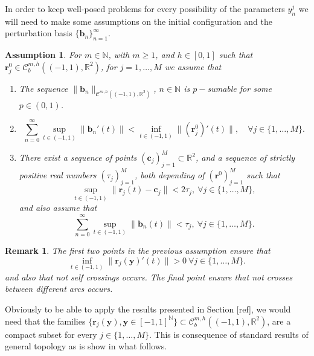 \documentclass{article}
\newtheorem{remark}[theorem]{Remark}
\newtheorem{assumption}[theorem]{Assumption}
\newcommand{\todo}[1]{{\color{red}[#1]}}
\newcommand{\IN}{{\mathbb N}}
\newcommand{\IR}{{\mathbb R}}
\newcommand{\cmspaceh}[4]{\mathcal{C}^{#1,#2} \left( #3, #4 \right)}
\newcommand{\rgeoh}[2]{\mathcal{C}_b^{#1,#2}\left( (-1,1), \IR^2 \right)}
\newcommand{\bc}{\bm{c}}
\newcommand{\br}{\bm{r}}
\newcommand{\by}{\bm{y}}
\newcommand{\bb}{\bm{b}}
\begin{document}
In order to keep well-posed problems for every possibility of the parameters $y^j_n$ we will need to make some assumptions on the initial configuration and the perturbation basis $\{\bb_n\}_{n=1}^\infty$. 

\begin{assumption}
\label{assump:geoparam}
For $m \in \IN$, with $m\geq 1$, and $h \in [0,1]$ such that $\br^0_j \in \rgeoh{m}{h}$, for $j =1,\hdots,M$ we assume that
\begin{enumerate}
\item 
The sequence $\|\bb_n\|_{\cmspaceh{m}{h}{(-1,1)}{\IR^2}}$, $n\in \IN$ is $p-$sumable for some $p \in (0,1)$.
\item 
$$\sum_{n=0}^\infty \sup_{t \in (-1,1)} \|  \bb_n'(t)\| < \inf_{t \in (-1,1)}\|(\br^0_j)'(t)\|,\quad \forall
j \in \{1,\hdots,M\}.
$$
\item
There exist a sequence of points $(\bc_j)_{j=1}^M \subset \IR^2$, and a sequence of strictly positive real numbers $(\tau_j)_{j=1}^M $, both depending of $(\br^0)_{j=1}^M$ such that 
$$\sup_{t\in(-1,1)} \| \br_j(t) - \bc_j \| < 2\tau_j,\ \forall j \in \{1,\hdots,M\},$$
and also assume that 
$$
\sum_{n=0}^\infty \sup_{t \in (-1,1)} \| \bb_n(t)\| <  \tau_j,\ \forall j \in \{1,\hdots,M\}.
$$
\end{enumerate}
\end{assumption}
\begin{remark}
The first two points in the previous assumption ensure that 
$$
\inf_{t \in (-1,1)} \| \br_j(\by)'(t) \| > 0 \ \forall j \in \{1,\hdots,M\}.
$$
and also that not self crossings occurs. The final point ensure that not crosses between different arcs occurs.
\end{remark}
Obviously to be able to apply the results presented in Section \todo{ref}, we would need that the families $\{\br_j(\by), \by \in [-1,1]^{\IN} \} \subset \rgeoh{m}{h}$, are a compact subset for every $j \in \{1,\hdots,M\}$. This is consequence of standard results of general topology as is show in what follows. 
\end{document}
